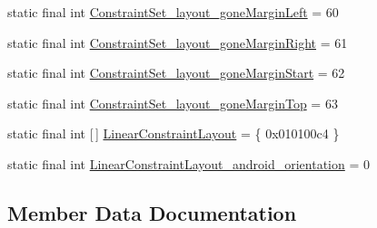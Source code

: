 \begin{DoxyCompactItemize}
\item 
static final int \mbox{\hyperlink{classandroid_1_1support_1_1constraint_1_1R_1_1styleable_ac433508e7b3a909da54b75327b7c3740}{Constraint\+Set\+\_\+layout\+\_\+gone\+Margin\+Left}} = 60
\item 
static final int \mbox{\hyperlink{classandroid_1_1support_1_1constraint_1_1R_1_1styleable_a483f89ba0a9f1556201f84cc11fa3deb}{Constraint\+Set\+\_\+layout\+\_\+gone\+Margin\+Right}} = 61
\item 
static final int \mbox{\hyperlink{classandroid_1_1support_1_1constraint_1_1R_1_1styleable_ae5cd1a96c0f9235a4b411dcf6df9497f}{Constraint\+Set\+\_\+layout\+\_\+gone\+Margin\+Start}} = 62
\item 
static final int \mbox{\hyperlink{classandroid_1_1support_1_1constraint_1_1R_1_1styleable_a48d4e9fa9a5f65b77b9ac76e11cde077}{Constraint\+Set\+\_\+layout\+\_\+gone\+Margin\+Top}} = 63
\item 
static final int \mbox{[}$\,$\mbox{]} \mbox{\hyperlink{classandroid_1_1support_1_1constraint_1_1R_1_1styleable_a3d1d810f2c6279b4ff255b6cd87b7b52}{Linear\+Constraint\+Layout}} = \{ 0x010100c4 \}
\item 
static final int \mbox{\hyperlink{classandroid_1_1support_1_1constraint_1_1R_1_1styleable_ab75931ca103e38ee68ee432610b0520c}{Linear\+Constraint\+Layout\+\_\+android\+\_\+orientation}} = 0
\end{DoxyCompactItemize}


\subsection{Member Data Documentation}
\mbox{\label{classandroid_1_1support_1_1constraint_1_1R_1_1styleable_a96a3757da6f0c088e10cc55aa2a6ed9f}} 
